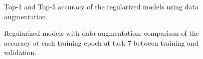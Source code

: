 \begin{figure}[H]
	\centering
	\caption{Top-1 and Top-5 accuracy of the regularized models using data augmentation.}%
	\label{fig:exp2}%
\end{figure}

\begin{figure}[H]
	\centering
	\caption{Regularized models with data augmentation: comparison of the accuracy at each training epoch at task 7 between training and validation.}%
	\label{fig:exp2-train_val}%
\end{figure}

